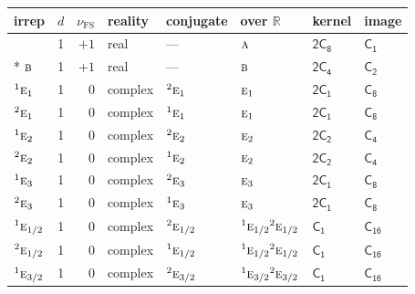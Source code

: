 \documentclass[10pt,a4paper]{article}
\makeatletter
\def\grouprule#1#2{\noalign{\marks\LTgroupmarks{\the\belowrulesep}\nobreak\vskip#1%
  \vskip\aboverulesep}\multispan\LT@cols\unskip{\leaders\hrule\@height#2\hfill\kern\z@}\cr
  \noalign{\penalty\LTrulebreak\vskip\belowrulesep\global\@lastruleclass\z@}}
\numberwithin{equation}{section}
\newcommand{\grp}[1]{\mathsf{#1}}
\newcommand{\irr}[1]{\text{\normalfont\scshape #1}}
\newcommand{\conjpair}[1]{{}^{#1}}
\newcommand{\detbox}[1]{{\setlength{\fboxsep}{1pt}\fbox{#1}}}
\newcommand{\fsind}{\nu_{\mathrm{FS}}}
\makeatother
\begin{document}
{\small\renewcommand{\arraystretch}{1.25}\setlength{\tabcolsep}{4pt}\begin{longtable}{@{}lrrlllll@{}}\toprule
irrep & $d$ & $\fsind$ & reality & conjugate & over $\mathbb{R}$ & kernel & image\\\midrule\endhead
\bottomrule\endfoot\endlastfoot
\detbox{$\irr{a}$} & 1 & $+1$ & real & --- & $\irr{a}$ & \href{2C8.pdf}{$\grp{2C_{8}}$} & \href{../../../rotation/data/pdf/C1.pdf}{$\grp{C_{1}}$}\\*
$\irr{b}$ & 1 & $+1$ & real & --- & $\irr{b}$ & \href{2C4.pdf}{$\grp{2C_{4}}$} & \href{../../../rotation/data/pdf/C2.pdf}{$\grp{C_{2}}$}\\
$\conjpair{1}\irr{e}_{1}$ & 1 & $0$ & complex & $\conjpair{2}\irr{e}_{1}$ & $\irr{e}_{1}$ & \href{2C1.pdf}{$\grp{2C_{1}}$} & \href{../../../rotation/data/pdf/C8.pdf}{$\grp{C_{8}}$}\\
$\conjpair{2}\irr{e}_{1}$ & 1 & $0$ & complex & $\conjpair{1}\irr{e}_{1}$ & $\irr{e}_{1}$ & \href{2C1.pdf}{$\grp{2C_{1}}$} & \href{../../../rotation/data/pdf/C8.pdf}{$\grp{C_{8}}$}\\
$\conjpair{1}\irr{e}_{2}$ & 1 & $0$ & complex & $\conjpair{2}\irr{e}_{2}$ & $\irr{e}_{2}$ & \href{2C2.pdf}{$\grp{2C_{2}}$} & \href{../../../rotation/data/pdf/C4.pdf}{$\grp{C_{4}}$}\\
$\conjpair{2}\irr{e}_{2}$ & 1 & $0$ & complex & $\conjpair{1}\irr{e}_{2}$ & $\irr{e}_{2}$ & \href{2C2.pdf}{$\grp{2C_{2}}$} & \href{../../../rotation/data/pdf/C4.pdf}{$\grp{C_{4}}$}\\
$\conjpair{1}\irr{e}_{3}$ & 1 & $0$ & complex & $\conjpair{2}\irr{e}_{3}$ & $\irr{e}_{3}$ & \href{2C1.pdf}{$\grp{2C_{1}}$} & \href{../../../rotation/data/pdf/C8.pdf}{$\grp{C_{8}}$}\\
$\conjpair{2}\irr{e}_{3}$ & 1 & $0$ & complex & $\conjpair{1}\irr{e}_{3}$ & $\irr{e}_{3}$ & \href{2C1.pdf}{$\grp{2C_{1}}$} & \href{../../../rotation/data/pdf/C8.pdf}{$\grp{C_{8}}$}\\
\grouprule{0pt}{\lightrulewidth}
$\conjpair{1}\irr{e}_{1/2}$ & 1 & $0$ & complex & $\conjpair{2}\irr{e}_{1/2}$ & $\conjpair{1}\irr{e}_{1/2}\conjpair{2}\irr{e}_{1/2}$ & \href{C1.pdf}{$\grp{C_{1}}$} & $\grp{C_{16}}$\\
$\conjpair{2}\irr{e}_{1/2}$ & 1 & $0$ & complex & $\conjpair{1}\irr{e}_{1/2}$ & $\conjpair{1}\irr{e}_{1/2}\conjpair{2}\irr{e}_{1/2}$ & \href{C1.pdf}{$\grp{C_{1}}$} & $\grp{C_{16}}$\\
$\conjpair{1}\irr{e}_{3/2}$ & 1 & $0$ & complex & $\conjpair{2}\irr{e}_{3/2}$ & $\conjpair{1}\irr{e}_{3/2}\conjpair{2}\irr{e}_{3/2}$ & \href{C1.pdf}{$\grp{C_{1}}$} & $\grp{C_{16}}$\\

\end{longtable}}
\end{document}
